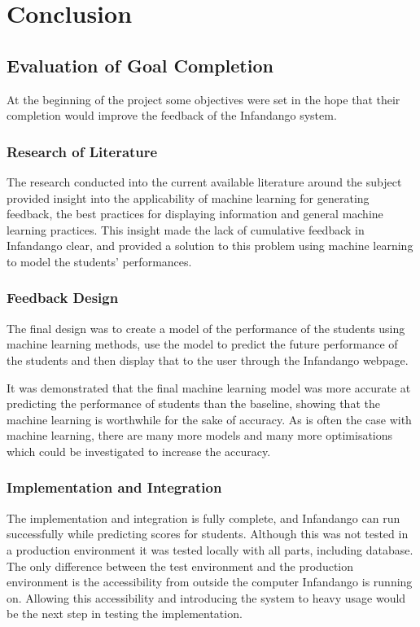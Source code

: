 \chapter{Conclusion}
\label{conclusion}
\section{Evaluation of Goal Completion}
At the beginning of the project some objectives were set in the hope that their completion would improve the feedback of the Infandango system. 

\subsection{Research of Literature}
The research conducted into the current available literature around the subject provided insight into the applicability of machine learning for generating feedback, the best practices for displaying information and general machine learning practices. This insight made the lack of cumulative feedback in Infandango clear, and provided a solution to this problem using machine learning to model the students' performances.

\subsection{Feedback Design}
The final design was to create a model of the performance of the students using machine learning methods, use the model to predict the future performance of the students and then display that to the user through the Infandango webpage. 

It was demonstrated that the final machine learning model was more accurate at predicting the performance of students than the baseline, showing that the machine learning is worthwhile for the sake of accuracy. As is often the case with machine learning, there are many more models and many more optimisations which could be investigated to increase the accuracy. 

\subsection{Implementation and Integration}
The implementation and integration is fully complete, and Infandango can run successfully while predicting scores for students. Although this was not tested in a production environment it was tested locally with all parts, including database. The only difference between the test environment and the production environment is the accessibility from outside the computer Infandango is running on. Allowing this accessibility and introducing the system to heavy usage would be the next step in testing the implementation.

